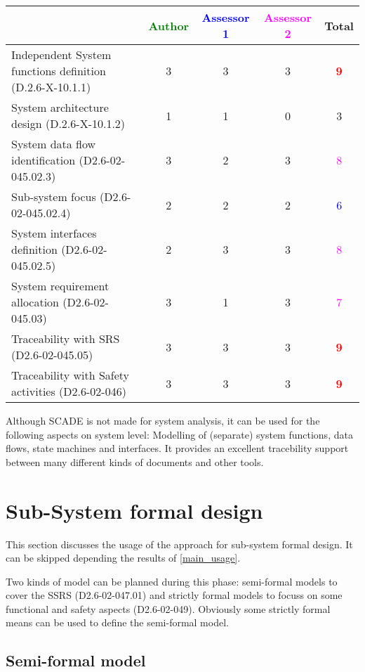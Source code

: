 \begin{tabular}{|l | c | c | c | c|}
\hline
& \textcolor{green}{Author} & \textcolor{blue}{Assessor 1} & \textcolor{magenta}{Assessor 2} & Total \\
\hline
Independent System functions definition (D.2.6-X-10.1.1)  &
3& 3     &3 & \textcolor{red}{\textbf{9}}  \\
\hline 
System architecture design (D.2.6-X-10.1.2) & 1     & 1     &
0& 3      \\
\hline
System data flow identification (D2.6-02-045.02.3)  &
3& 2     &3 & \textcolor{magenta}{8} \\
\hline
Sub-system focus (D2.6-02-045.02.4)  &  2& 2     &2 &  \textcolor{blue}{6} \\
\hline
System interfaces definition (D2.6-02-045.02.5)  &
2& 3     &3 & \textcolor{magenta}{8}  \\
\hline
System requirement allocation (D2.6-02-045.03)  &  3&
1 &3 &  \textcolor{magenta}{7} \\
\hline
Traceability with SRS (D2.6-02-045.05)  &  3& 3     &3 & \textcolor{red}{\textbf{9}}  \\
\hline
Traceability with Safety activities (D2.6-02-046)  &
3 & 3     &3 & \textcolor{red}{\textbf{9}}  \\
\hline
\end{tabular}

\begin{author_comment}
Although SCADE is not made for system analysis, it can be used for the following aspects on system level: Modelling of (separate) system functions, data flows, state machines and interfaces. It provides an excellent tracebility support between many different kinds of documents and other tools.  
\end{author_comment}


\section{Sub-System formal design}
This section discusses the usage of the approach for sub-system formal design.
It can be skipped depending the results of \ref{main_usage}.

Two kinds of model can be planned during this phase: semi-formal models to  cover the SSRS (D2.6-02-047.01) and strictly formal  models to  focuss on some functional and safety aspects (D2.6-02-049).  Obviously some strictly  formal means can be used to define the semi-formal  model.

\subsection{Semi-formal model}

